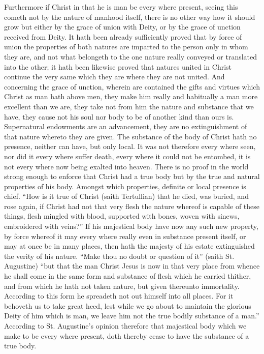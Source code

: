 Furthermore if Christ in that he is man be every where present, seeing this cometh not by the nature of manhood itself, there is no other way how it should grow but either by the grace of union with Deity, or by the grace of unction received from Deity. It hath been already sufficiently proved that by force of union the properties of both natures are imparted to the person only in whom they are, and not what belongeth to the one nature really conveyed or translated into the other; it hath been likewise proved that natures united in Christ continue the very same which they are where they are not united. And concerning the grace of unction, wherein are contained the gifts and virtues which Christ as man hath above men, they make him really and habitually a man more excellent than we are, they take not from him the nature and substance that we have, they cause not his soul nor body to be of another kind than ours is. Supernatural endowments are an advancement, they are no extinguishment of that nature whereto they are given.
The substance of the body of Christ hath no presence, neither can have, but only local. It was not therefore every where seen, nor did it every where suffer death, every where it could not be entombed, it is not every where now being exalted into heaven. There is no proof in the world strong enough to enforce that Christ had a true body but by the true and natural properties of his body. Amongst which properties, definite or local presence is chief. “How is it true of Christ (saith Tertullian) that he died, was buried, and rose again, if Christ had not that very flesh the nature whereof is capable of these things, flesh mingled with blood, supported with bones, woven with sinews, embroidered with  veins?” If his majestical body have now any such new property, by force whereof it may every where really even in substance present itself, or may at once be in many places, then hath the majesty of his estate extinguished the verity of his nature. “Make thou no doubt or question of it” (saith St. Augustine) “but that the man Christ Jesus is now in that very place from whence he shall come in the same form and substance of flesh which he carried thither, and from which he hath not taken nature, but given thereunto immortality. According to this form he spreadeth not out himself into all places. For it behoveth us to take great heed, lest while we go about to maintain the glorious Deity of him which is man, we leave him not the true bodily substance of a man.” According to St. Augustine’s opinion therefore that majestical body which we make to be every where present, doth thereby cease to have the substance of a true body.
